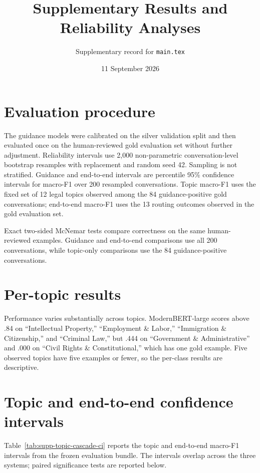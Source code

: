 \documentclass[11pt]{article}
\title{Supplementary Results and Reliability Analyses}
\author{Supplementary record for \texttt{main.tex}}
\date{11 September 2026}
\begin{document}
\maketitle

\section{Evaluation procedure}

The guidance models were calibrated on the silver validation split and then evaluated once on the human-reviewed gold evaluation set without further adjustment. Reliability intervals use 2,000 non-parametric conversation-level bootstrap resamples with replacement and random seed 42. Sampling is not stratified. Guidance and end-to-end intervals are percentile 95\% confidence intervals for macro-F1 over 200 resampled conversations. Topic macro-F1 uses the fixed set of 12 legal topics observed among the 84 guidance-positive gold conversations; end-to-end macro-F1 uses the 13 routing outcomes observed in the gold evaluation set.

Exact two-sided McNemar tests compare correctness on the same human-reviewed examples. Guidance and end-to-end comparisons use all 200 conversations, while topic-only comparisons use the 84 guidance-positive conversations.

\section{Per-topic results}



Performance varies substantially across topics. ModernBERT-large scores above .84 on ``Intellectual Property,'' ``Employment \& Labor,'' ``Immigration \& Citizenship,'' and ``Criminal Law,'' but .444 on ``Government \& Administrative'' and .000 on ``Civil Rights \& Constitutional,'' which has one gold example. Five observed topics have five examples or fewer, so the per-class results are descriptive.

\section{Topic and end-to-end confidence intervals}



Table~\ref{tab:supp-topic-cascade-ci} reports the topic and end-to-end macro-F1 intervals from the frozen evaluation bundle. The intervals overlap across the three systems; paired significance tests are reported below.
\end{document}
